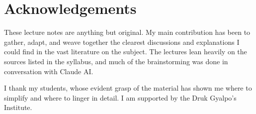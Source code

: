 \chapter*{Acknowledgements}

These lecture notes are anything but original. My main contribution has been to gather,
adapt, and weave together the clearest discussions and explanations I could find in the vast
literature on the subject. The lectures lean heavily on the sources listed in the syllabus, and
much of the brainstorming was done in conversation with Claude AI.

\vspace{0.3cm}

I thank my students, whose evident grasp of the material has shown me where to simplify
and where to linger in detail. I am supported by the Druk Gyalpo's Institute.
